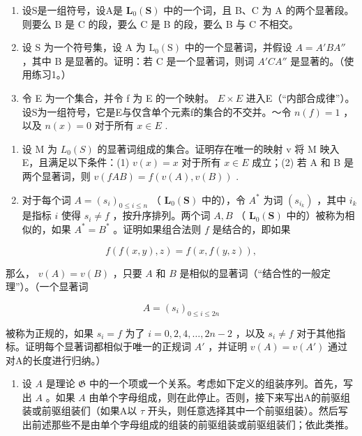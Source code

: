 \appendixexercisegroup

\begin{enumerate}
\def\labelenumi{\arabic{enumi}.}
\item
  设S是一组符号，设A是 \(\mathbf{L}_{0}(\mathbf{S})\) 中的一个词，且 B、C 为 A 的两个显著段。则要么 B 是 C 的段，要么 C 是 B 的段，要么 B 与 C 不相交。
\item
  设 S 为一个符号集，设 A 为 \(\mathrm{L}_{0}(\mathrm{S})\) 中的一个显著词，并假设 \(A = A'BA''\) ，其中 B 是显著的。证明：若 C 是一个显著词，则词 \(A'CA''\) 是显著的。（使用练习1。）
\item
  令 E 为一个集合，并令 f 为 E 的一个映射。 \(E \times E\) 进入E（“内部合成律”）。设S为一组符号，它是E与仅含单个元素f的集合的不交并。～令 \(n(f) = 1\) ，以及 \(n(x) = 0\) 对于所有 \(x \in E\) .
\end{enumerate}

\begin{enumerate}
\def\labelenumi{(\alph{enumi})}
\item
  设 M 为 \(L_{0}(S)\) 的显著词组成的集合。证明存在唯一的映射 v 将 M 映入 E，且满足以下条件：(1) \(v(x) = x\) 对于所有 \(x \in E\) 成立；(2) 若 A 和 B 是两个显著词，则 \(v(fAB) = f(v(A), v(B))\) .
\item
  对于每个词 \(A = (s_i)_{0 \leqslant i \leqslant n}\) （ \(\mathbf{L}_0(\mathbf{S})\) 中的），令 \(A^*\) 为词 \((s_{i_k})\) ，其中 \(i_k\) 是指标 \(i\) 使得 \(s_i \neq f\) ，按升序排列。两个词 \(A, B\) （ \(\mathbf{L}_0(\mathbf{S})\) 中的）被称为相似的，如果 \(A^* = B^*\) 。证明如果组合法则 \(f\) 是结合的，即如果
\end{enumerate}

\[
f (f (x, y), z) = f (x, f (y, z)),
\]

那么， \(v(A) = v(B)\) ，只要 \(A\) 和 \(B\) 是相似的显著词（“结合性的一般定理”）。（一个显著词

\[
A = (s _ {i}) _ {0 \leqslant i \leqslant 2 n}
\]

被称为正规的，如果 \(s_{i}=f\) 为了 \(i=0,2,4,\ldots,2n-2\) ，以及 \(s_{i}\neq f\) 对于其他指标。证明每个显著词都相似于唯一的正规词 \(A'\) ，并证明 \(v(A)=v(A')\) 通过对A的长度进行归纳。）

\begin{enumerate}
\def\labelenumi{\arabic{enumi}.}
\setcounter{enumi}{3}
\tightlist
\item
  设 \(A\) 是理论 \(\mathfrak{G}\) 中的一个项或一个关系。考虑如下定义的组装序列。首先，写出 \(A\) 。如果 \(A\) 由单个字母组成，则在此停止。否则，接下来写出A的前驱组装或前驱组装们（如果A以 \(\tau\) 开头，则任意选择其中一个前驱组装）。然后写出前述那些不是由单个字母组成的组装的前驱组装或前驱组装们；依此类推。
\end{enumerate}

